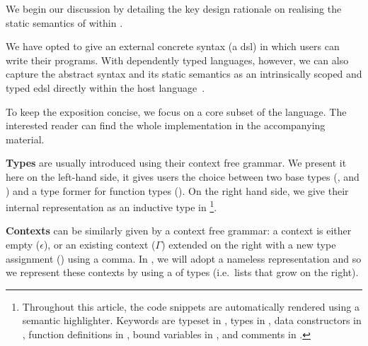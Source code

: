 We begin our discussion by detailing the key design rationale on
realising the static semantics of \Velo{} within \Idris{}.

We have opted to give \Velo{} an external concrete syntax (a \ac{dsl})
in which users can write their programs.
%
With dependently typed languages, however, we can also capture
the abstract syntax and its static semantics as an intrinsically
scoped and typed \ac{edsl}
directly within the host language~\cite{Augustsson1999edt}.

To keep the exposition concise, we focus on a core subset of the
language. The interested reader can find the whole implementation
in the accompanying material.

\textbf{Types} are usually introduced using their context free grammar.
%
We present it here on the left-hand side, it gives users the choice between
two base types (\TyNat, and \TyBool) and a type former for function types
(\TyFunc{\cdot}{\cdot}).
%
On the right hand side, we give their internal representation as an inductive
type in \Idris{}
\footnote{
Throughout this article, the \Idris{} code snippets are
automatically rendered using a semantic highlighter.
%
Keywords are typeset in ,
types in ,
data constructors in ,
function definitions in ,
bound variables in ,
and comments in .
}.

\begin{center}
\begin{minipage}{0.45\textwidth}
\syntaxtypes
\end{minipage}\hfill
\begin{minipage}{0.45\textwidth}
\end{minipage}
\end{center}

\textbf{Contexts} can be similarly given by a context free grammar:
a context is either empty ($\epsilon$), or an existing context ($\Gamma$)
extended on the right with a new type assignment () using a comma.
%
In \Idris{}, we will adopt a nameless representation and so we represent
these contexts by using a  of types
(i.e.\ lists that grow on the right).


\begin{center}
\begin{minipage}{0.35\textwidth}
\syntaxcontexts
\end{minipage}\hfill
\begin{minipage}{0.55\textwidth}
\end{minipage}
\end{center}


